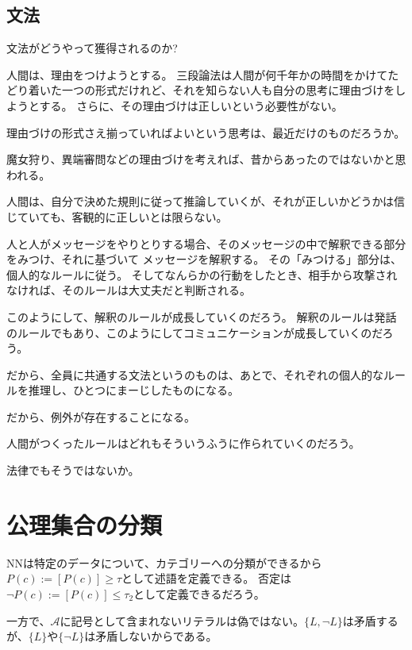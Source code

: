 \documentclass[10pt, oneside]{jarticle}   	%
\begin{document}
\subsection{文法}
文法がどうやって獲得されるのか?

人間は、理由をつけようとする。
三段論法は人間が何千年かの時間をかけてたどり着いた一つの形式だけれど、それを知らない人も自分の思考に理由づけをしようとする。
さらに、その理由づけは正しいという必要性がない。

理由づけの形式さえ揃っていればよいという思考は、最近だけのものだろうか。

魔女狩り、異端審問などの理由づけを考えれば、昔からあったのではないかと思われる。

人間は、自分で決めた規則に従って推論していくが、それが正しいかどうかは信じていても、客観的に正しいとは限らない。

人と人がメッセージをやりとりする場合、そのメッセージの中で解釈できる部分をみつけ、それに基づいて
メッセージを解釈する。
その「みつける」部分は、個人的なルールに従う。
そしてなんらかの行動をしたとき、相手から攻撃されなければ、そのルールは大丈夫だと判断される。

このようにして、解釈のルールが成長していくのだろう。
解釈のルールは発話のルールでもあり、このようにしてコミュニケーションが成長していくのだろう。

だから、全員に共通する文法というのものは、あとで、それぞれの個人的なルールを推理し、ひとつにまーじしたものになる。

だから、例外が存在することになる。

人間がつくったルールはどれもそういうふうに作られていくのだろう。

法律でもそうではないか。

\section{公理集合の分類}
NNは特定のデータについて、カテゴリーへの分類ができるから$P(c) := [P(c)] \geq \tau$として述語を定義できる。
否定は$\neg P(c) := [P(c)] \leq \tau_2$として定義できるだろう。

一方で、$\mathcal{A}$に記号として含まれないリテラルは偽ではない。$\{L, \neg L\}$は矛盾するが、$\{ L\}$や$\{\neg L \}$は矛盾しないからである。
\end{document}
